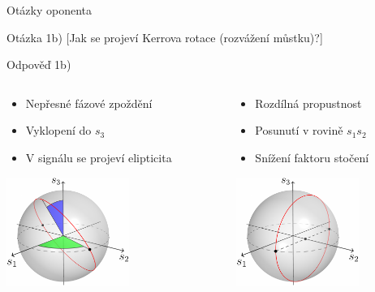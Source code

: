 \begin{frame}{Otázky oponenta}
    \begin{block}{Otázka 1b)}
        [Jak se projeví Kerrova rotace (rozvážení můstku)?]
    \end{block}
    
    \begin{exampleblock}{Odpověď 1b)}
        \begin{columns}
            \begin{column}{0.5\textwidth}
                \begin{itemize}
                    \item Nepřesné fázové zpoždění
                    \item Vyklopení do $s_3$ 
                    \item V signálu se projeví elipticita
                \end{itemize} 
                \includegraphics[width=4cm]{img/kovek-4.pdf}
            \end{column}
            \begin{column}{0.5\textwidth}
                \begin{itemize}
                    \item Rozdílná propustnost
                    \item Posunutí v rovině $s_1s_2$
                    \item Snížení faktoru stočení
                \end{itemize} 
                \includegraphics[width=4cm]{img/kovek-6.pdf}
            \end{column}
        \end{columns}
    \end{exampleblock}
\end{frame}

